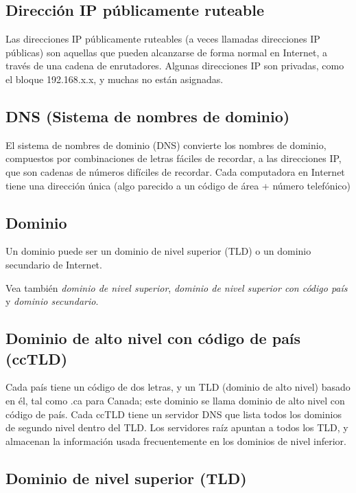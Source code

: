 \subsection{Dirección IP públicamente
ruteable}\label{direcciuxf3n-ip-puxfablicamente-ruteable}

Las direcciones IP públicamente ruteables (a veces llamadas direcciones
IP públicas) son aquellas que pueden alcanzarse de forma normal en
Internet, a través de una cadena de enrutadores. Algunas direcciones IP
son privadas, como el bloque 192.168.x.x, y muchas no están asignadas.

\subsection{DNS (Sistema de nombres de
dominio)}\label{dns-sistema-de-nombres-de-dominio}

El sistema de nombres de dominio (DNS) convierte los nombres de dominio,
compuestos por combinaciones de letras fáciles de recordar, a las
direcciones IP, que son cadenas de números difíciles de recordar. Cada
computadora en Internet tiene una dirección única (algo parecido a un
código de área + número telefónico)

\subsection{Dominio}\label{dominio}

Un dominio puede ser un dominio de nivel superior (TLD) o un dominio
secundario de Internet.

Vea también \emph{dominio de nivel superior}, \emph{dominio de nivel
superior con código país} y \emph{dominio secundario}.

\subsection{Dominio de alto nivel con código de país
(ccTLD)}\label{dominio-de-alto-nivel-con-cuxf3digo-de-pauxeds-cctld}

Cada país tiene un código de dos letras, y un TLD (dominio de alto
nivel) basado en él, tal como .ca para Canada; este dominio se llama
dominio de alto nivel con código de país. Cada ccTLD tiene un servidor
DNS que lista todos los dominios de segundo nivel dentro del TLD. Los
servidores raíz apuntan a todos los TLD, y almacenan la información
usada frecuentemente en los dominios de nivel inferior.

\subsection{Dominio de nivel superior
(TLD)}\label{dominio-de-nivel-superior-tld}

